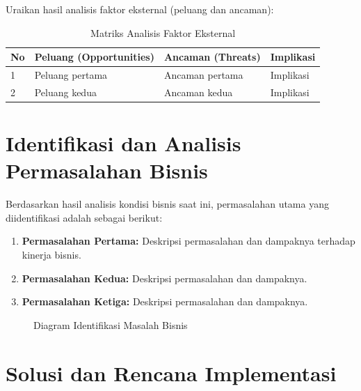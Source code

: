 Uraikan hasil analisis faktor eksternal (peluang dan ancaman):

\begin{table}[H]
\caption{Matriks Analisis Faktor Eksternal}
\label{tab:analisis-eksternal}
\begin{isitable}
\begin{tabular}{p{0.5cm} p{5cm} p{5cm} p{4cm}}
\toprule
\textbf{No} & \textbf{Peluang (Opportunities)} & \textbf{Ancaman (Threats)} & \textbf{Implikasi} \\
\midrule
1 & Peluang pertama & Ancaman pertama & Implikasi \\
2 & Peluang kedua & Ancaman kedua & Implikasi \\
\bottomrule
\end{tabular}
\end{isitable}
\end{table}

\section{Identifikasi dan Analisis Permasalahan Bisnis}
\label{sec:identifikasi-masalah-bisnis}

Berdasarkan hasil analisis kondisi bisnis saat ini, permasalahan utama yang diidentifikasi
adalah sebagai berikut:

\begin{enumerate}
  \item \textbf{Permasalahan Pertama:} Deskripsi permasalahan dan dampaknya terhadap
        kinerja bisnis.
  \item \textbf{Permasalahan Kedua:} Deskripsi permasalahan dan dampaknya.
  \item \textbf{Permasalahan Ketiga:} Deskripsi permasalahan dan dampaknya.
\end{enumerate}

\begin{figure}[H]
\centering
\caption{Diagram Identifikasi Masalah Bisnis}
\label{fig:diagram-masalah}
\end{figure}

\section{Solusi dan Rencana Implementasi}
\label{sec:solusi-implementasi}

